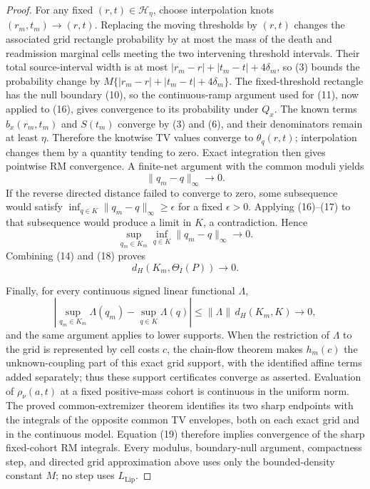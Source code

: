 \documentclass{article}
\begin{document}
\begin{proof}
For any fixed \((r,t)\in\mathcal H_\eta\), choose interpolation knots \((r_m,t_m)\to(r,t)\).  Replacing the moving thresholds by \((r,t)\) changes the associated grid rectangle probability by at most the mass of the death and readmission marginal cells meeting the two intervening threshold intervals.  Their total source-interval width is at most \(|r_m-r|+|t_m-t|+4\delta_m\), so (3) bounds the probability change by \(M\{|r_m-r|+|t_m-t|+4\delta_m\}\).  The fixed-threshold rectangle has the null boundary (10), so the continuous-ramp argument used for (11), now applied to (16), gives convergence to its probability under \(Q_x\).  The known terms \(b_x(r_m,t_m)\) and \(S(t_m)\) converge by (3) and (6), and their denominators remain at least \(\eta\).  Therefore the knotwise TV values converge to \(\theta_q(r,t)\); interpolation changes them by a quantity tending to zero.  Exact integration then gives pointwise RM convergence.  A finite-net argument with the common moduli yields
\[
 \|q_m-q\|_\infty\longrightarrow0. \tag{17}
\]
If the reverse directed distance failed to converge to zero, some subsequence would satisfy \(\inf_{q\in K}\|q_m-q\|_\infty\geq\epsilon\) for a fixed \(\epsilon>0\).  Applying (16)--(17) to that subsequence would produce a limit in \(K\), a contradiction.  Hence
\[
 \sup_{q_m\in K_m}\inf_{q\in K}\|q_m-q\|_\infty\longrightarrow0. \tag{18}
\]
Combining (14) and (18) proves
\[
 d_H(K_m,\Theta_I(P))\longrightarrow0. \tag{19}
\]

Finally, for every continuous signed linear functional \(\Lambda\),
\[
 \left|\sup_{q_m\in K_m}\Lambda(q_m)
       -\sup_{q\in K}\Lambda(q)\right|
 \leq \|\Lambda\|\,d_H(K_m,K)\longrightarrow0, \tag{20}
\]
and the same argument applies to lower supports.  When the restriction of \(\Lambda\) to the grid is represented by cell costs \(c\), the chain-flow theorem makes \(h_m(c)\) the unknown-coupling part of this exact grid support, with the identified affine terms added separately; thus these support certificates converge as asserted.  Evaluation of \(\rho_\nu(a,t)\) at a fixed positive-mass cohort is continuous in the uniform norm.  The proved common-extremizer theorem identifies its two sharp endpoints with the integrals of the opposite common TV envelopes, both on each exact grid and in the continuous model.  Equation (19) therefore implies convergence of the sharp fixed-cohort RM integrals.  Every modulus, boundary-null argument, compactness step, and directed grid approximation above uses only the bounded-density constant \(M\); no step uses \(L_{\mathrm{Lip}}\).
\end{proof}
\end{document}
